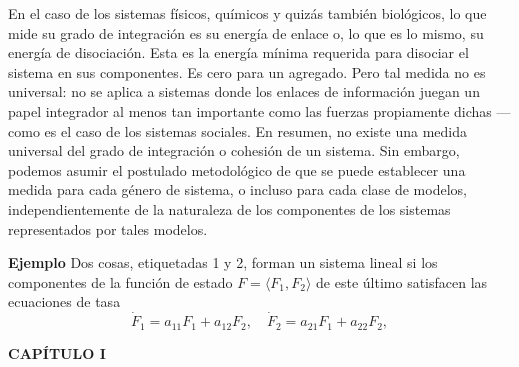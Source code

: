 {En el caso de los sistemas físicos, químicos y quizás también biológicos, lo que mide su grado de integración es su energía de enlace o, lo que es lo mismo, su energía de disociación. Esta es la energía mínima requerida para disociar el sistema en sus componentes. Es cero para un agregado. Pero tal medida no es universal: no se aplica a sistemas donde los enlaces de información juegan un papel integrador al menos tan importante como las fuerzas propiamente dichas —como es el caso de los sistemas sociales. En resumen, no existe una medida universal del grado de integración o cohesión de un sistema. Sin embargo, podemos asumir el postulado metodológico de que se puede establecer una medida para cada género de sistema, o incluso para cada clase de modelos, independientemente de la naturaleza de los componentes de los sistemas representados por tales modelos.

\textbf{Ejemplo} Dos cosas, etiquetadas 1 y 2, forman un sistema lineal si los componentes de la función de estado \( F = \langle F_1, F_2 \rangle \) de este último satisfacen las ecuaciones de tasa
\[\dot{F}_1 = a_{11}F_1 + a_{12}F_2, \quad \dot{F}_2 = a_{21}F_1 + a_{22}F_2,\]
}

\newpage
\fancyhf{}
\fancyhead[l]{\thepage}
\begin{center}
{\fontsize{16}{18}\selectfont \textbf{CAPÍTULO I}}
\end{center}
\vspace{0.5cm}


